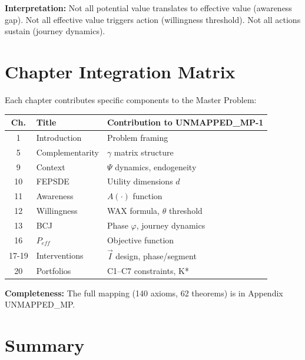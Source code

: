 \textbf{Interpretation:} Not all potential value translates to effective value (awareness gap). Not all effective value triggers action (willingness threshold). Not all actions sustain (journey dynamics).


\section{Chapter Integration Matrix}
\label{sec:25-integration}

Each chapter contributes specific components to the Master Problem:

\begin{tcolorbox}[colback=gray!5!white,colframe=gray!75!black,
    title=\textbf{Chapter Contribution Matrix (Selected)}]
\small
\begin{tabular}{|c|l|l|}
\hline
\textbf{Ch.} & \textbf{Title} & \textbf{Contribution to UNMAPPED_MP-1} \\
\hline
1 & Introduction & Problem framing \\
5 & Complementarity & $\gamma$ matrix structure \\
9 & Context & $\Psi$ dynamics, endogeneity \\
10 & FEPSDE & Utility dimensions $d$ \\
11 & Awareness & $A(\cdot)$ function \\
12 & Willingness & WAX formula, $\theta$ threshold \\
13 & BCJ & Phase $\varphi$, journey dynamics \\
16 & $P_{eff}$ & Objective function \\
17-19 & Interventions & $\vec{I}$ design, phase/segment \\
20 & Portfolios & C1--C7 constraints, K* \\
\hline
\end{tabular}
\end{tcolorbox}

\textbf{Completeness:} The full mapping (140 axioms, 62 theorems) is in Appendix UNMAPPED_MP.


\section{Summary}
\label{sec:25-summary}

